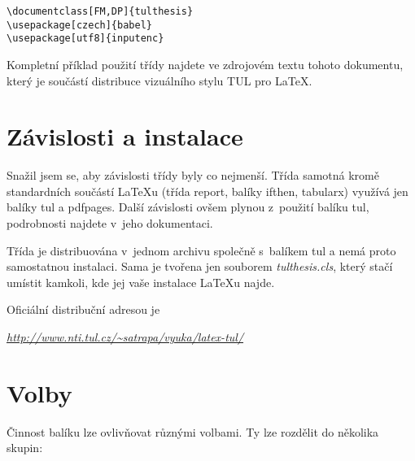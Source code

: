 \documentclass[FM,SP]{tulthesis}
\newcommand{\argument}[1]{{\ttfamily\color{\tulcolor}#1}}
\newenvironment{myquote}{\begin{list}{}{\setlength\leftmargin\parindent}\item[]}{\end{list}}
\newenvironment{listing}{\begin{myquote}\color{\tulcolor}}{\end{myquote}}
\begin{document}
\begin{listing}
\begin{verbatim}
\documentclass[FM,DP]{tulthesis}
\usepackage[czech]{babel}
\usepackage[utf8]{inputenc}
\end{verbatim}
\end{listing}

Kompletní příklad použití třídy najdete ve zdrojovém textu tohoto dokumentu,
který je součástí distribuce vizuálního stylu TUL pro \LaTeX.


\chapter{Závislosti a instalace}

Snažil jsem se, aby závislosti třídy byly co nejmenší. Třída samotná kromě
standardních součástí \LaTeX u (třída \argument{report}, balíky
\argument{ifthen}, \argument{tabularx}) využívá jen balíky \argument{tul} a
\argument{pdfpages}. Další závislosti ovšem plynou z~použití balíku
\argument{tul}, podrobnosti najdete v~jeho dokumentaci.

Třída je distribuována v~jednom archivu společně s~balíkem \argument{tul} a
nemá proto samostatnou instalaci. Sama je tvořena jen souborem
\emph{tulthesis.cls}, který stačí umístit kamkoli, kde jej vaše instalace
\LaTeX u najde. 

Oficiální distribuční adresou je

\begin{listing}
\href{http://www.nti.tul.cz/~satrapa/vyuka/latex-tul/}{\emph{http://www.nti.tul.cz/\textasciitilde satrapa/vyuka/latex-tul/}}
\end{listing}


\chapter{Volby}\label{volby}

Činnost balíku lze ovlivňovat různými volbami. Ty lze rozdělit do několika
skupin:
\end{document}
